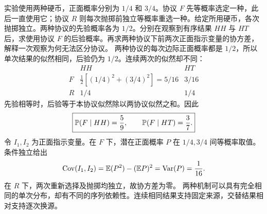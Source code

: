 实验使用两种硬币，正面概率分别为 $1/4$ 和 $3/4$。协议 $F$ 先等概率选定一种，此后一直使用它；协议 $R$ 则每次抛掷前独立等概率重选一种。给定所用硬币，各次抛掷独立。两种协议的先验概率各为 $1/2$。分别在观察到有序结果 $HH$ 与 $HT$ 后，求使用协议 $F$ 的后验概率。再求两种协议下前两次正面指示变量的协方差，解释一次观察为何无法区分协议。
\solution 两种协议的每次边际正面概率都是 $1/2$，所以单次结果的似然相同，后验仍为 $1/2$。连续两次的似然却不同：
\[
\begin{array}{c|cc}
&HH&HT\\ \hline
F&\tfrac12[(1/4)^2+(3/4)^2]=5/16&3/16\\
R&1/4&1/4
\end{array}
\]
先验相等时，后验等于本协议似然除以两协议似然之和。因此
\[
\boxed{\mathbb{P}(F\mid HH)=\frac59,\qquad
\mathbb{P}(F\mid HT)=\frac37.}
\]
令 $I_1,I_2$ 为正面指示变量。在 $F$ 下，潜在正面概率 $P$ 在 $1/4,3/4$ 间等概率取值。条件独立给出
\[
\operatorname{Cov}(I_1,I_2)=\mathbb{E}(P^2)-(\mathbb{E} P)^2=\operatorname{Var}(P)=\frac1{16}.
\]
在 $R$ 下，两次重新选择及抛掷均独立，故协方差为零。
\insight 两种机制可以具有完全相同的单次分布，却有不同的序列依赖性。连续相同结果支持固定来源，交替结果相对支持逐次换源。

